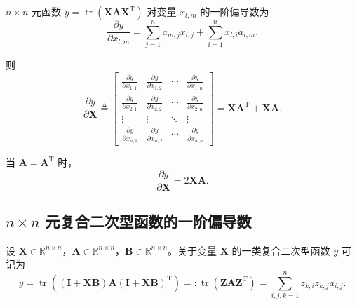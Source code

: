 $n \times n$ 元函数 $y = \operatorname{tr} \left( \boldsymbol{X} \boldsymbol{A} \boldsymbol{X}^{\mathrm{T}} \right)$ 对变量 $x_{l,m}$ 的一阶偏导数为
\begin{equation*}
\frac{\partial y}{\partial x_{l,m}} = \sum_{j=1}^{n} a_{m,j} x_{l,j} + \sum_{i=1}^{n} x_{l,i} a_{i,m}.
\end{equation*}

则
\begin{equation*}
\frac{\partial y}{\partial \boldsymbol{X}} \triangleq \begin{bmatrix}
\displaystyle \frac{\partial y}{\partial x_{1,1}} & \displaystyle \frac{\partial y}{\partial x_{1,2}} & \cdots & \displaystyle \frac{\partial y}{\partial x_{1,n}} \\[8pt]
\displaystyle \frac{\partial y}{\partial x_{2,1}} & \displaystyle \frac{\partial y}{\partial x_{2,2}} & \cdots & \displaystyle \frac{\partial y}{\partial x_{2,n}} \\[4pt]
\vdots & \vdots & \ddots & \vdots \\[4pt]
\displaystyle \frac{\partial y}{\partial x_{n,1}} & \displaystyle \frac{\partial y}{\partial x_{n,2}} & \cdots & \displaystyle \frac{\partial y}{\partial x_{n,n}}
\end{bmatrix} = \boldsymbol{X} \boldsymbol{A}^{\mathrm{T}} + \boldsymbol{X} \boldsymbol{A}.
\end{equation*}

当 $\boldsymbol{A} = \boldsymbol{A}^{\mathrm{T}}$ 时，
\begin{equation*}
\frac{\partial y}{\partial \boldsymbol{X}} = 2 \boldsymbol{X} \boldsymbol{A}.
\end{equation*}

\subsection{$n \times n$ 元复合二次型函数的一阶偏导数}

设 $\boldsymbol{X} \in \mathbb{R}^{n \times n}$，$\boldsymbol{A} \in \mathbb{R}^{n \times n}$，$\boldsymbol{B} \in \mathbb{R}^{n \times n}$。关于变量 $\boldsymbol{X}$ 的一类复合二次型函数 $y$ 可记为
\begin{equation*}
y = \operatorname{tr} \left( (\boldsymbol{I} + \boldsymbol{X} \boldsymbol{B}) \boldsymbol{A} (\boldsymbol{I} + \boldsymbol{X} \boldsymbol{B})^{\mathrm{T}} \right) =: \operatorname{tr} \left( \boldsymbol{Z} \boldsymbol{A} \boldsymbol{Z}^{\mathrm{T}} \right) = \sum_{i,j,k=1}^{n} z_{k,i} z_{k,j} a_{i,j}.
\end{equation*}

